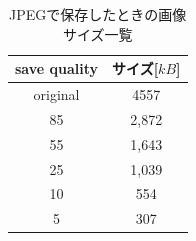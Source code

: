 \documentclass[a4paper,11pt]{bxjsarticle}
\begin{document}
  \begin{table}[htb]
    \begin{center}
      \caption{JPEGで保存したときの画像サイズ一覧}
      \begin{tabular}{|c|c|} \hline
        save quality & サイズ[$kB$] \\\hline
        original & 4557  \\
        85 & 2,872  \\ 
        55 & 1,643  \\
        25 & 1,039 \\
        10 & 554 \\
        5 & 307 \\\hline

      \end{tabular}
      \label{tab:result_jpeg_filesize}
    \end{center}
  \end{table}
\end{document}
